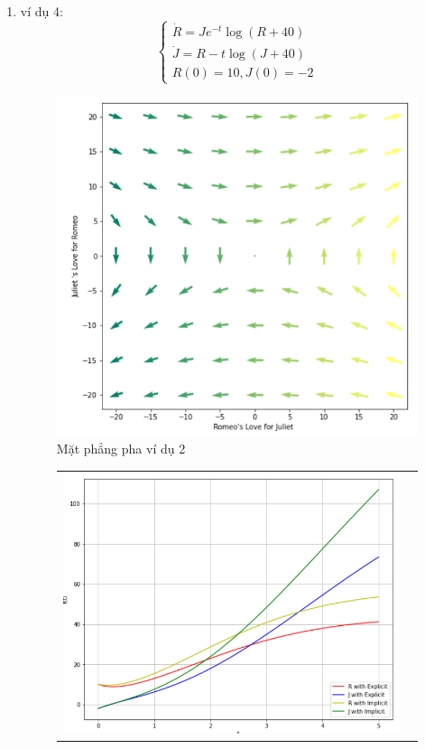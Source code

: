 \documentclass[a4paper]{article}
\begin{document}
\begin{enumerate}
\begin{enumerate}
\item ví dụ 4:
    \begin{equation} \label{ex:vd4}
        \begin{cases}
    \dot{R}=Je^{-t}\log(R+40)\\
    \dot{J}=R-t\log(J+40)\\
    R(0)=10,J(0) = -2
        \end{cases}
    \end{equation}
    \begin{figure}[htp]
    \centering
    \includegraphics[scale = .8]{Images/Bt4/vd4/field.png}
    \caption{Mặt phẳng pha ví dụ 2}
\end{figure} 
\newpage
\begin{figure}[htp] 
    \begin{tabular}{cc}
        \includegraphics[scale=.58]{Images/Bt4/vd4/h=0,1.png} &

\end{tabular}
\end{figure}
\end{enumerate}
\end{enumerate}
\end{document}
